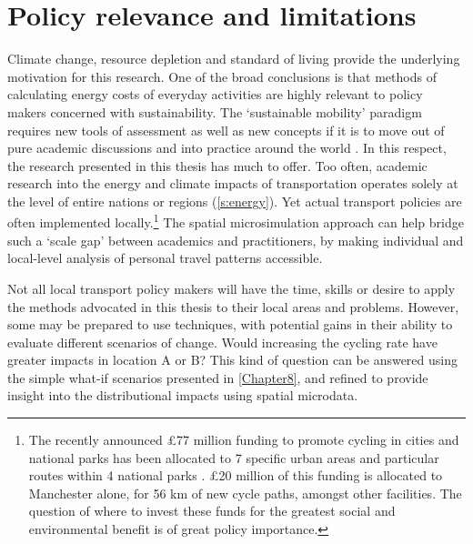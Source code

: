 \section{Policy relevance and limitations} \label{sprel}
Climate change, resource depletion and standard of living provide the underlying
motivation for this research. One of the broad conclusions is that
methods of calculating energy costs of everyday activities are
highly relevant to policy makers concerned with sustainability. The
`sustainable mobility' paradigm requires new tools of assessment
as well as new concepts if it is to move out of pure academic discussions and
into practice around the world \citep{Banister2008}. In this respect, the
research presented in this thesis has much to offer. Too often, academic
research into the energy and climate impacts of transportation operates solely
at the level of entire nations or regions (\cref{s:energy}). Yet actual
transport
policies are often implemented locally.\footnote{The recently announced
\pounds77 million funding to promote cycling in cities and
national parks has been allocated to 7 specific urban areas and particular
routes within 4 national parks
\citep{RimeMinister'sOfficea}. \pounds 20 million of this funding is
allocated to Manchester alone, for 56 km of new cycle paths, amongst other
facilities. The question of where to invest these funds for the greatest social
and environmental benefit is of great policy importance.
}
The spatial microsimulation approach can help bridge such a `scale gap'
between academics and practitioners, by making individual and local-level
analysis of personal travel patterns accessible.

Not all local transport policy makers will have the time, skills or
desire to apply the methods advocated in this thesis to their local areas
and problems. However, some may be prepared to use techniques, with potential gains
in their ability to evaluate different scenarios of change. Would
increasing the cycling rate have greater impacts in location A or B? This kind
of question can be answered using the simple what-if scenarios presented in
\cref{Chapter8}, and refined to provide insight into the distributional impacts
using spatial microdata.

